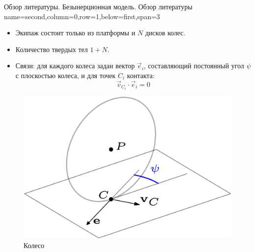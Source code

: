 \begin{myposter}{
    Обзор литературы. Безынерционная модель.
}
    \headerbox
    {Обзор литературы}
    {name=second,column=0,row=1,below=first,span=3}
    {
        \vspace{10pt}
        {\huge\bf
            \begin{itemize}
                \item {
                    Экипаж состоит только из платформы и $N$ дисков колес.
                }
                \item {
                    Количество твердых тел $1 + N$.
                }
                \item {
                    Связи: для каждого колеса задан вектор $\vec{e}_i$, составляющий постоянный угол $\psi$ с плоскостью колеса, и для точек $C_i$ контакта:
                    \vspace{-15pt}
                    $$\vec{v}_{C_i} \cdot \vec{e}_i = 0$$
                }
            \end{itemize}
            \vspace{-10pt}
            \begin{figure}[H]
                \centering
                    \centering
                    \includegraphics[width=\textwidth]{content/pic/asypng/wheel_bor.png}
                    \caption{Колесо}
                    \label{fig:bor_wheel_scheme}
                \endminipage
                    \centering

\end{figure}}}
\end{myposter}
